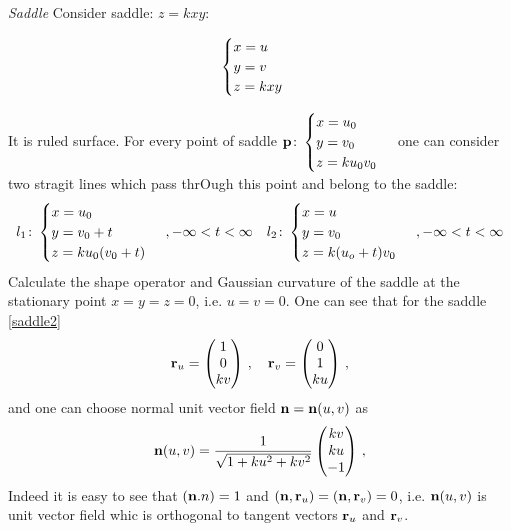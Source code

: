 \documentclass[12pt]{article}
\theoremstyle{theorem}
\numberwithin{equation}{section}
\begin{document}
{\m


{\it Saddle} Consider saddle: $z=kxy$:

  \begin{equation}\label{saddle2}
     \begin{cases}
      x=u\cr
       y=v\cr
        z=kxy\cr
      \end{cases}
       \end{equation}     

 It is ruled surface.
     For  every point of saddle 
${\bf p}\colon \begin{cases}
      x=u_0\cr
       y=v_0\cr
        z=ku_0v_0\cr
      \end{cases} $
one can consider two stragit  lines which pass
 thrOugh this point and 
belong to the saddle:  
   \begin{equation*}\label{saddleruledsurface}
     l_1\colon 
      \begin{cases}
      x=u_0\cr
       y=v_0+t\cr
        z=ku_0(v_0+t)\cr
      \end{cases}\,,
         -\infty<t<\infty\quad
     l_2\colon 
      \begin{cases}
      x=u\cr
       y=v_0\cr
        z=k(u_o+t)v_0\cr
      \end{cases}\,,  -\infty<t<\infty
       \end{equation*}     
Calculate the shape operator and Gaussian curvature of
the saddle at the stationary point 
 $x=y=z=0$, i.e. $u=v=0$.
One can see that for the saddle \eqref{saddle2}
      $$
{\bf r}_u=\begin{pmatrix}
     1\cr 0\cr kv\cr
    \end{pmatrix}\,,\quad
{\bf r}_v=\begin{pmatrix}
     0\cr 1\cr ku\cr
    \end{pmatrix}\,,
         $$
and one can choose normal unit vector field ${\bf n}={\bf n}(u,v)$
as
                 $$
      {\bf n}(u,v)=
       {1\over \sqrt {1+ku^2+kv^2}}\begin{pmatrix}
     kv\cr ku\cr -1\cr
    \end{pmatrix}\,,
      $$
   Indeed it is easy to see that
   $({\bf n}.n)=1$ and $({\bf n},{\bf r}_u)=({\bf n},{\bf r}_v)=0$,
i.e. ${\bf n}(u,v)$ is unit vector field whic is orthogonal
to tangent vectors ${\bf r}_u$ and ${\bf r}_v$.

}
\end{document}
